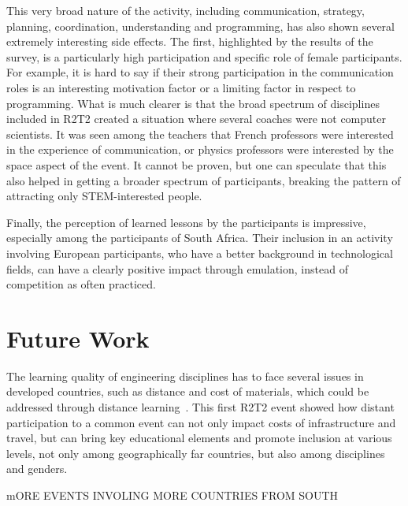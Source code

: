 \documentclass{intech-journal}
\begin{document}
This very broad nature of the activity, including communication, strategy, planning, coordination, understanding and programming, has also shown several extremely interesting side effects.
The first, highlighted by the results of the survey, is a particularly high participation and specific role of female participants.
For example, it is hard to say if their strong participation in the communication roles is an interesting motivation factor or a limiting factor in respect to programming. 
What is much clearer is that the broad spectrum of disciplines included in R2T2 created a situation where several coaches were not computer scientists. 
It was seen among the teachers that French professors were interested in the experience of communication, or physics professors were interested by the space aspect of the event. 
It cannot be proven, but one can speculate that this also helped in getting a broader spectrum of participants, breaking the pattern of attracting only STEM-interested people.

Finally, the perception of learned lessons by the participants is impressive, especially among the participants of South Africa.
Their inclusion in an activity involving European participants, who have a better background in technological fields, can have a clearly positive impact through emulation, instead of competition as often practiced. 

\section{Future Work}
The learning quality of engineering disciplines has to face several issues in developed countries, such as distance and cost of materials, which could be addressed through distance learning~\cite{winthrop2012new}. 
This first R2T2 event showed how distant participation to a common event can not only impact costs of infrastructure and travel, but can bring key educational elements and promote inclusion at various levels, not only among geographically far countries, but also among disciplines and genders.

mORE EVENTS INVOLING MORE COUNTRIES FROM SOUTH


\small
{}
\end{document}
